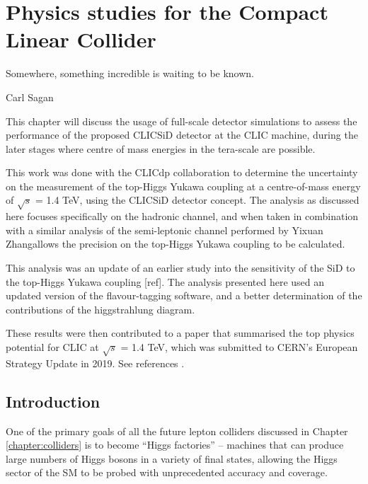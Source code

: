 
\chapter{Physics studies for the Compact Linear Collider}
\label{chapter:analysis}

\epigraph{Somewhere, something incredible is waiting to be known.}{Carl Sagan}

This chapter will discuss the usage of full-scale detector simulations to assess the performance of the proposed \acrshort{CLIC}\textunderscore \acrshort{SiD} detector at the \acrlong{CLIC} machine, during the later stages where centre of mass energies in the tera-scale are possible.

This work was done with the \acrfull{CLICdp} collaboration to determine the uncertainty on the measurement of the top-Higgs Yukawa coupling at a centre-of-mass energy of $\sqrt{s}$ = 1.4 TeV, using the \acrshort{CLIC}\textunderscore \acrshort{SiD} detector concept. The analysis as discussed here focuses specifically on the hadronic channel, and when taken in combination with a similar analysis of the semi-leptonic channel performed by Yixuan Zhang allows the precision on the top-Higgs Yukawa coupling to be calculated.

This analysis was an update of an earlier study into the sensitivity of the \acrshort{SiD} to the top-Higgs Yukawa coupling [ref]. The analysis presented here used an updated version of the flavour-tagging software, and a better determination of the contributions of the higgstrahlung diagram.

These results were then contributed to a paper that summarised the top physics potential for \acrshort{CLIC} at $\sqrt{s}$ = 1.4 TeV, which was submitted to \acrshort{CERN}'s European Strategy Update in 2019. See references \cite{clic-top-quark-physics} \cite{clic-2018-summary}.

\section{Introduction}
One of the primary goals of all the future lepton colliders discussed in Chapter \ref{chapter:colliders} is to become ``Higgs factories'' -- machines that can produce large numbers of Higgs bosons in a variety of final states, allowing the Higgs sector of the \acrlong{SM} to be probed with unprecedented accuracy and coverage.

